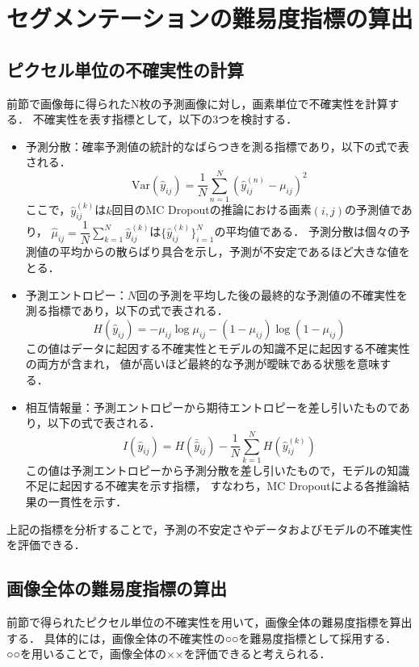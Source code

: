 \documentclass[10pt, a4paper, twocolumn]{jarticle}
\begin{document}
\section{セグメンテーションの難易度指標の算出}

\subsection{ピクセル単位の不確実性の計算}
前節で画像毎に得られたN枚の予測画像に対し，画素単位で不確実性を計算する．
不確実性を表す指標として，以下の3つを検討する．

\begin{itemize}
  \item 予測分散：確率予測値の統計的なばらつきを測る指標であり，以下の式で表される．
  \begin{equation}
    \text{Var}(\hat{y}_{ij}) = \frac{1}{N} \sum_{n=1}^{N} (\hat{y}_{ij}^{(n)} - \mu_{ij})^2
  \end{equation}
  ここで，$\hat{y}_{ij}^{(k)}$は$k$回目のMC Dropoutの推論における画素$(i, j)$の予測値であり，
  $\hat{\mu}_{ij} = \dfrac{1}{N} \sum_{k = 1}^{N} \hat{y}_{ij} ^ {(k)}$は$\{\hat{y}_{ij} ^ {(k)}\}_{i = 1} ^ {N}$の平均値である．
  予測分散は個々の予測値の平均からの散らばり具合を示し，予測が不安定であるほど大きな値をとる．
  \item 予測エントロピー：$N$回の予測を平均した後の最終的な予測値の不確実性を測る指標であり，以下の式で表される．
  \begin{equation}
    H(\hat{y}_{ij}) = - \mu_{ij} \log{\mu_{ij}} - (1 - \mu_{ij}) \log{(1 - \mu_{ij})}
  \end{equation}
  この値はデータに起因する不確実性とモデルの知識不足に起因する不確実性の両方が含まれ，
  値が高いほど最終的な予測が曖昧である状態を意味する．
  \item 相互情報量：予測エントロピーから期待エントロピーを差し引いたものであり，以下の式で表される．
  \begin{equation}
    I(\hat{y}_{ij}) = H(\bar{\hat{y}}_{ij}) - \frac{1}{N}\sum_{k=1}^{N} H(\hat{y}_{ij}^{(k)})
  \end{equation}
  この値は予測エントロピーから予測分散を差し引いたもので，モデルの知識不足に起因する不確実を示す指標，
  すなわち，MC Dropoutによる各推論結果の一貫性を示す．
\end{itemize}

上記の指標を分析することで，予測の不安定さやデータおよびモデルの不確実性を評価できる．

\subsection{画像全体の難易度指標の算出}
前節で得られたピクセル単位の不確実性を用いて，画像全体の難易度指標を算出する．
具体的には，画像全体の不確実性の○○を難易度指標として採用する．
○○を用いることで，画像全体の××を評価できると考えられる．
\end{document}
